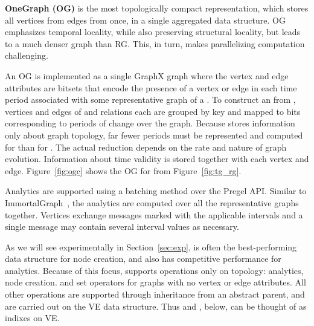 {\bf OneGraph (OG)} is the most topologically compact representation,
which stores all vertices from  edges from \tae once, in
a single aggregated data structure.  OG emphasizes temporal locality,
while also preserving structural locality, but leads to a much denser
graph than RG.  This, in turn, makes parallelizing computation
challenging.

An OG is implemented as a single GraphX graph where the vertex and
edge attributes are bitsets that encode the presence of a vertex or
edge in each time period associated with some representative graph of
a \tg.  To construct an \og from \tve, vertices and edges of \tv and
\te relations each are grouped by key and mapped to bits corresponding
to periods of change over the graph.  Because \og stores information
only about graph topology, far fewer periods must be represented and
computed for \og than for \rg.  The actual reduction depends on the
rate and nature of graph evolution.  Information about time validity
is stored together with each vertex and edge.  Figure~\ref{fig:ogc}
shows the OG for  from Figure~\ref{fig:tg_rg}.

Analytics are supported using a batching method over the Pregel API.
Similar to ImmortalGraph~\cite{Miao2015}, the analytics are computed
over all the representative graphs together.  Vertices exchange
messages marked with the applicable intervals and a single message may
contain several interval values as necessary.

As we will see experimentally in Section~\ref{sec:exp}, \og is often
the best-performing data structure for node creation, and also has
competitive performance for analytics.  Because of this focus, \og
supports operations only on topology: analytics, node creation. and
set operators for graphs with no vertex or edge attributes.  All other
operations are supported through inheritance from an abstract parent,
and are carried out on the VE data structure.  Thus \og and \hg,
below, can be thought of as indixes on VE.

